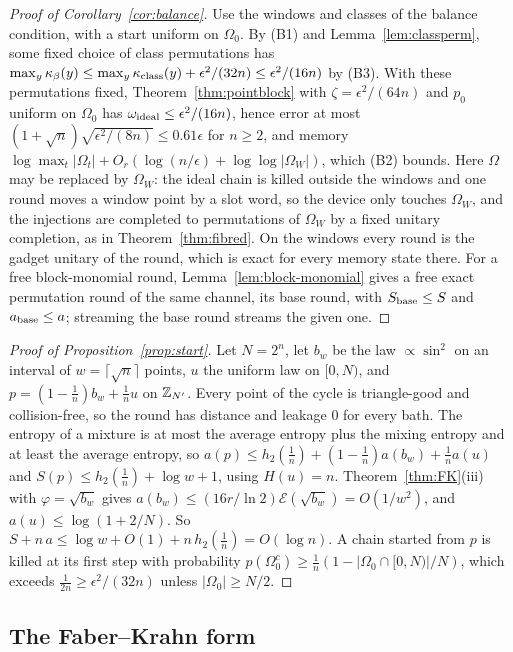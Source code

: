 \begin{proof}[Proof of Corollary~\ref{cor:balance}]
Use the windows and classes of the balance condition, with a start uniform on $\Omega_0$. By (B1) and Lemma~\ref{lem:classperm}, some fixed choice of class permutations has
$\max_y\kappa_\beta(y)\le\max_y\kappa_{\rm class}(y)+\epsilon^2/(32n)\le\epsilon^2/(16n)$ by (B3). With these permutations fixed, Theorem~\ref{thm:pointblock} with $\zeta=\epsilon^2/(64n)$
and $p_0$ uniform on $\Omega_0$ has $\omega_{\rm ideal}\le\epsilon^2/(16n)$, hence error at most $(1+\sqrt n)\sqrt{\epsilon^2/(8n)}\le0.61\epsilon$ for $n\ge2$, and memory
$\log\max_t|\Omega_t|+O_r(\log(n/\epsilon)+\log\log|\Omega_W|)$, which (B2) bounds. Here $\Omega$ may be replaced by $\Omega_W$: the ideal chain is
killed outside the windows and one round moves a window point by a slot word, so the device only touches $\Omega_W$, and the injections are completed
to permutations of $\Omega_W$ by a fixed unitary completion, as in Theorem~\ref{thm:fibred}. On the windows every round is the gadget unitary of the round, which is exact for every
memory state there. For a free block-monomial round, Lemma~\ref{lem:block-monomial} gives a free exact permutation round of the same channel, its base round, with
$S_{\rm base}\le S$ and $a_{\rm base}\le a$; streaming the base round streams the given one.
\end{proof}

\begin{proof}[Proof of Proposition~\ref{prop:start}]
Let $N=2^n$, let $b_w$ be the law $\propto\sin^2$ on an interval of $w=\lceil\sqrt n\rceil$ points, $u$ the uniform law on $[0,N)$, and $p=(1-\frac1n)b_w+\frac1nu$ on $\mathbb Z_{N'}$.
Every point of the cycle is triangle-good and collision-free, so the round has distance and leakage $0$ for every bath. The entropy of a mixture is at most the average
entropy plus the mixing entropy and at least the average entropy, so $a(p)\le h_2(\frac1n)+(1-\frac1n)a(b_w)+\frac1na(u)$ and $S(p)\le h_2(\frac1n)+\log w+1$, using $H(u)=n$.
Theorem~\ref{thm:FK}(iii) with $\varphi=\sqrt{b_w}$ gives $a(b_w)\le(16r/\ln2)\mathcal E(\sqrt{b_w})=O(1/w^2)$, and $a(u)\le\log(1+2/N)$. So $S+n\,a\le\log w+O(1)+n\,h_2(\frac1n)=O(\log n)$.
A chain started from $p$ is killed at its first step with probability $p(\Omega_0^c)\ge\frac1n(1-|\Omega_0\cap[0,N)|/N)$, which exceeds $\frac1{2n}\ge\epsilon^2/(32n)$ unless
$|\Omega_0|\ge N/2$.
\end{proof}

\subsection{The Faber--Krahn form}

